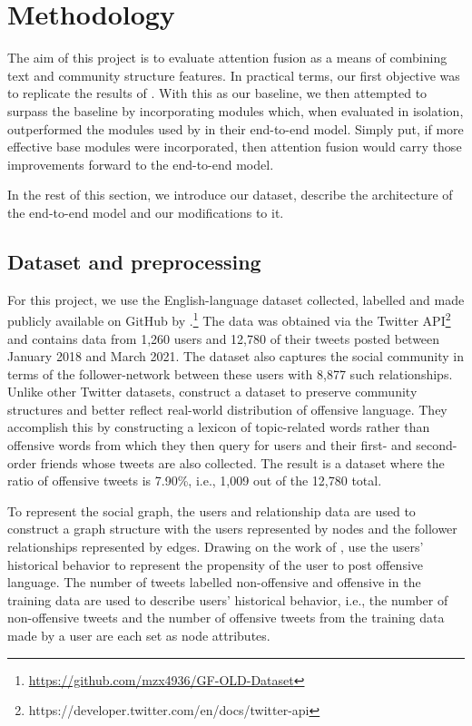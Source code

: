 \documentclass[letterpaper]{article} %
\begin{document}
\section{Methodology}

The aim of this project is to evaluate attention fusion as a means of combining text and community structure features. In practical terms, our first objective was to replicate the results of \citet{Miao2022}. With this as our baseline, we then attempted to surpass the baseline by incorporating modules which, when evaluated in isolation, outperformed the modules used by \citet{Miao2022} in their end-to-end model. Simply put, if more effective base modules were incorporated, then attention fusion would carry those improvements forward to the end-to-end model.

In the rest of this section, we introduce our dataset, describe the architecture of the end-to-end model and our modifications to it. 

\subsection{Dataset and preprocessing}

For this project, we use the English-language dataset collected, labelled and made publicly available on GitHub by \citet{Miao2022}.\footnote{\url{https://github.com/mzx4936/GF-OLD-Dataset}} The data was obtained via the Twitter API\footnote{https://developer.twitter.com/en/docs/twitter-api} and contains data from 1,260 users and 12,780 of their tweets posted between January 2018 and March 2021. The dataset also captures the social community in terms of the follower-network between these users with 8,877 such relationships. Unlike other Twitter datasets, \citet{Miao2022} construct a dataset to preserve community structures and better reflect real-world distribution of offensive language. They accomplish this by constructing a lexicon of topic-related words rather than offensive words from which they then query for users and their first- and second-order friends whose tweets are also collected. The result is a dataset where the ratio of offensive tweets is 7.90\%, i.e., 1,009 out of the 12,780 total.

To represent the social graph, the users and relationship data are used to construct a graph structure with the users represented by nodes and the follower relationships represented by edges. Drawing on the work of \citet{Mishra2019}, \citet{Miao2022} use the users' historical behavior to represent the propensity of the user to post offensive language. The number of tweets labelled non-offensive and offensive in the training data are used to describe users' historical behavior, i.e., the number of non-offensive tweets and the number of offensive tweets from the training data made by a user are each set as node attributes.
\end{document}
